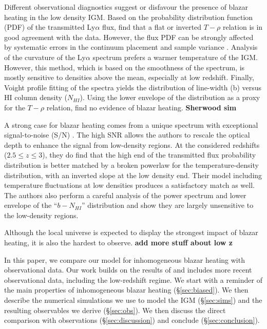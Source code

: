 \documentclass[numberedappendix]{emulateapj}
\newcommand\ALc[1]{{\color{red} \bf #1}} %
\begin{document}
Different observational diagnostics suggest or disfavour the presence of blazar heating in the low density IGM. Based on the probability distribution function (PDF) of the transmitted Ly$\alpha$ flux, \citet{2007MNRAS.382.1657K,2008MNRAS.386.1131B,2009MNRAS.399L..39V,2012MNRAS.422.3019C} find that a flat or inverted  $T-\rho$ relation is in good agreement with the data. However, the flux PDF can be strongly affected by systematic errors in the continuum placement \citep{2012ApJ...753..136L} and sample variance \citep{2013MNRAS.428..540R}. Analysis of the curvature of the Ly$\alpha$ spectrum \citep{2011MNRAS.410.1096B,2014MNRAS.441.1916B} prefers a warmer temperature of the IGM. However, this method, which is based on the smoothness of the spectrum, is mostly sensitive to densities above the mean, especially at low redshift. Finally, Voight profile fitting of the spectra yields the distribution of line-width (b) versus HI column density ($N_{HI}$). Using the lower envelope of the distribution as a proxy for the $T-\rho$ relation, \citet{2012ApJ...757L..30R,2014MNRAS.438.2499B} find no evidence of blazar heating.\ALc{Sherwood sim}

A strong case for blazar heating comes from a unique spectrum with exceptional signal-to-noise  (S/N) \citep{2017MNRAS.466.2690R}.  The high SNR allows the authors to rescale the optical depth to enhance the signal from low-density regions. At the considered redshifts ($2.5\leq z \leq 3$), they do find that the 
high end of the transmitted flux probability distribution is better matched by a broken powerlaw for the temperature-density distribution, with an inverted slope at the low density end. Their model including temperature fluctuations at low densities produces a satisfactory match as well. The authors also perform a careful analysis of the power spectrum and lower envelope of the ``$b-N_{HI}$'' distribution and show they are largely  unsensitive to the low-density regions. 

Although the local universe is expected to display the  strongest impact of blazar heating, it is also the hardest to observe. \ALc{add more stuff about low z}


In this paper, we compare our model for inhomogeneous blazar heating with observational data. Our work builds on the results of \citep{2012MNRAS.423..149P} and includes more recent observational data, including the low-redshift regime.  We start with a reminder of the main properties of inhomogeneous blazar heating (\S\ref{sec:biased}). We then describe the numerical simulations we use to model the IGM (\S\ref{sec:sims}) and the resulting observables we derive (\S\ref{sec:obs}). We then discuss the direct comparison with observations (\S\ref{sec:discussion}) and conclude (\S\ref{sec:conclusion}).
\end{document}
